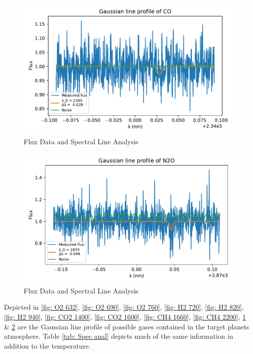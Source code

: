 \documentclass[reprint,english,notitlepage]{revtex4-2}
\begin{document}
\begin{figure}[h!]
  \centering
  \includegraphics[scale =.5]{Figures/CO 2340.pdf}
  \caption{Flux Data and Spectral Line Analysis}
  \label{fig: CO 2340}
\end{figure}

\begin{figure}[h!]
  \centering
  \includegraphics[scale =.5]{Figures/N2O 2870.pdf}
  \caption{Flux Data and Spectral Line Analysis}
  \label{fig: N20 2870}
\end{figure}
\clearpage

Depicted in \ref{fig: O2 632}, \ref{fig: O2 690}, \ref{fig: O2 760}, \ref{fig: H2 720}, \ref{fig: H2 820}, \ref{fig: H2 940}, \ref{fig: CO2 1400}, \ref{fig: CO2 1600}, \ref{fig: CH4 1660}, \ref{fig: CH4 2200}, \ref{fig: CO 2340} \& \ref{fig: N20 2870} are the Gaussian line profile of possible gases contained in the target planets atmosphere. Table \ref{tab: Spec anal} depicts much of the same information in addition to the temperature. 
\end{document}
